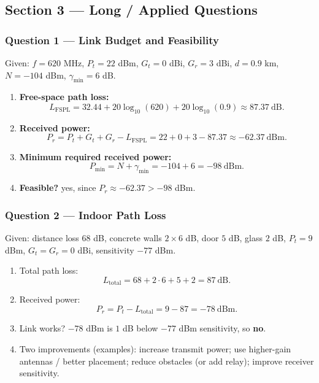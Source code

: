 \documentclass[11pt,a4paper]{article}
\begin{document}
\subsection*{Section 3 --- Long / Applied Questions}

\subsubsection*{Question 1 --- Link Budget and Feasibility}
Given: $f=620$ MHz, $P_t=22$ dBm, $G_t=0$ dBi, $G_r=3$ dBi, $d=0.9$ km, $N=-104$ dBm, $\gamma_{\min}=6$ dB.

\begin{enumerate}[label=\alph*.]
    \item \textbf{Free-space path loss:}
    \[
    L_{\mathrm{FSPL}}=32.44+20\log_{10}(620)+20\log_{10}(0.9)\approx 87.37\ \mathrm{dB}.
    \]
    \item \textbf{Received power:}
    \[
    P_r=P_t+G_t+G_r-L_{\mathrm{FSPL}}=22+0+3-87.37\approx -62.37\ \mathrm{dBm}.
    \]
    \item \textbf{Minimum required received power:}
    \[
    P_{\min}=N+\gamma_{\min}=-104+6=-98\ \mathrm{dBm}.
    \]
    \item \textbf{Feasible?} yes, since $P_r\approx -62.37 > -98$ dBm.
    
\end{enumerate}

\subsubsection*{Question 2 --- Indoor Path Loss}
Given: distance loss $68$ dB, concrete walls $2\times 6$ dB, door $5$ dB, glass $2$ dB, $P_t=9$ dBm, $G_t=G_r=0$ dBi, sensitivity $-77$ dBm.

\begin{enumerate}[label=\alph*.]
    \item Total path loss:
    \[
    L_{\text{total}}=68+2\cdot 6+5+2=87\ \mathrm{dB}.
    \]
    \item Received power:
    \[
    P_r=P_t-L_{\text{total}}=9-87=-78\ \mathrm{dBm}.
    \]
    \item Link works? $-78$ dBm is $1$ dB below $-77$ dBm sensitivity, so \textbf{no}.
    \item Two improvements (examples): increase transmit power; use higher-gain antennas / better placement; reduce obstacles (or add relay); improve receiver sensitivity.
\end{enumerate}
\end{document}
